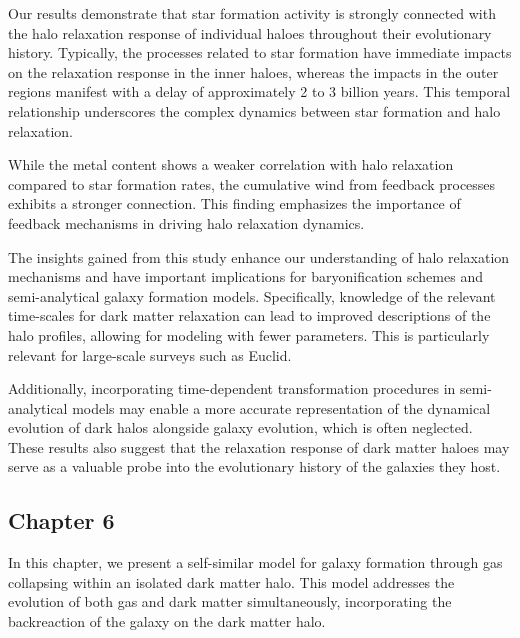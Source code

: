 \documentclass[a4paper, 12pt, oneside]{Thesis}  %
\begin{document}
Our results demonstrate that star formation activity is strongly connected with the halo relaxation response of individual haloes throughout their evolutionary history. Typically, the processes related to star formation have immediate impacts on the relaxation response in the inner haloes, whereas the impacts in the outer regions manifest with a delay of approximately 2 to 3 billion years. This temporal relationship underscores the complex dynamics between star formation and halo relaxation.

While the metal content shows a weaker correlation with halo relaxation compared to star formation rates, the cumulative wind from feedback processes exhibits a stronger connection. This finding emphasizes the importance of feedback mechanisms in driving halo relaxation dynamics.

The insights gained from this study enhance our understanding of halo relaxation mechanisms and have important implications for baryonification schemes and semi-analytical galaxy formation models. Specifically, knowledge of the relevant time-scales for dark matter relaxation can lead to improved descriptions of the halo profiles, allowing for modeling with fewer parameters. This is particularly relevant for large-scale surveys such as Euclid.

Additionally, incorporating time-dependent transformation procedures in semi-analytical models may enable a more accurate representation of the dynamical evolution of dark halos alongside galaxy evolution, which is often neglected. These results also suggest that the relaxation response of dark matter haloes may serve as a valuable probe into the evolutionary history of the galaxies they host.



\subsection*{Chapter 6}

In this chapter, we present a self-similar model for galaxy formation through gas collapsing within an isolated dark matter halo. This model addresses the evolution of both gas and dark matter simultaneously, incorporating the backreaction of the galaxy on the dark matter halo.
\end{document}
